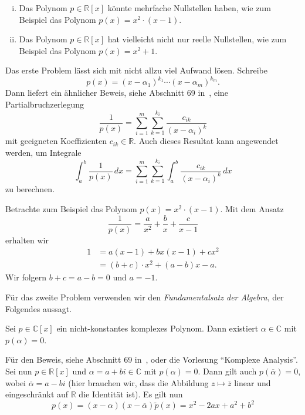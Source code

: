 \documentclass[../main.tex]{subfiles}
\begin{document}
\begin{issues}
  \leavevmode
  \begin{enumerate}[(i)]
    \item Das Polynom $p \in \mathbb{R}[x]$ könnte mehrfache
      Nullstellen haben, wie zum Beispiel
      das Polynom $p(x) = x^2 \cdot (x - 1)$.
    \item Das Polynom $p \in \mathbb{R}[x]$ hat vielleicht
      nicht nur reelle Nullstellen, wie zum Beispiel
      das Polynom $p(x) = x^2 + 1$.
  \end{enumerate}
\end{issues}

Das erste Problem lässt sich mit nicht allzu viel Aufwand lösen.
Schreibe
\[
  p(x) = {(x - \alpha_1)}^{k_1} \cdots
  {(x - \alpha_m)}^{k_m}.
\]
Dann liefert ein ähnlicher Beweis,
siehe Abschnitt 69 in~\cite{heuser},
eine Partialbruchzerlegung
\[
  \frac{1}{p(x)} = \sum_{i=1}^{m} \sum_{k=1}^{k_i} 
  \frac{c_{ik}}{{(x - \alpha_i)}^k}
\]
mit geeigneten Koeffizienten $c_{ik} \in \mathbb{R}$.
Auch dieses Resultat kann angewendet werden,
um Integrale
\[
  \int_{a}^{b} \frac{1}{p(x)} \, dx
  = \sum_{i=1}^{m} \sum_{k=1}^{k_i} \int_{a}^{b} 
  \frac{c_{ik}}{{(x - \alpha_i)}^k}\, dx
\]
zu berechnen.

\begin{example}
  Betrachte zum Beispiel das Polynom
    $p(x) = x^2 \cdot (x - 1)$.
  Mit dem Ansatz
  \[
    \frac{1}{p(x)} = \frac{a}{x^2} + \frac{b}{x}
    + \frac{c}{x-1}
  \]
  erhalten wir
  \begin{align*}
    1 & 
    = a(x - 1) + b x (x - 1) + cx^2\\
      &= (b + c) \cdot x^2 + (a - b) x - a.
  \end{align*}
  Wir folgern $b + c = a - b = 0$ und $a = -1$.
\end{example}
  
Für das zweite Problem verwenden wir den
\emph{Fundamentalsatz der Algebra},
der Folgendes aussagt.

\begin{lemma}
  Sei $p \in \mathbb{C}[x]$ ein nicht-konstantes
  komplexes Polynom. Dann existiert $\alpha \in \mathbb{C}$ 
  mit $p( \alpha ) = 0$.
\end{lemma}

Für den Beweis, siehe Abschnitt 69 in~\cite{heuser}, oder
die Vorlesung ``Komplexe Analysis''.
Sei nun $p \in \mathbb{R}[x]$ und $\alpha = a + bi \in \mathbb{C}$ 
mit $p ( \alpha ) = 0$.
Dann gilt auch
$p(\overline \alpha) = 0$,
wobei $\overline \alpha = a - bi$
(hier brauchen wir, dass die Abbildung
$z \mapsto \overline z$ linear
und eingeschränkt auf $\mathbb{R}$ die Identität ist).
Es gilt nun
\[
  p(x) = (x - \alpha)(x - \overline \alpha) \widetilde{p}(x)
  = x^2 - 2ax + a^2 + b^2
\]
\end{document}
